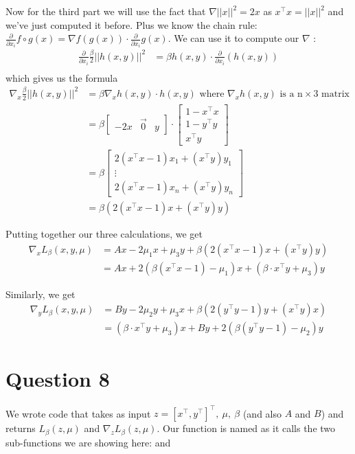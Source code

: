 \documentclass{article}
\newcommand{\tp}{^\top}
\newcommand{\p}{\frac{\partial}{\partial x_i}}
\begin{document}
Now for the third part we will use the fact that $\nabla||x||^2=2x$ as $x\tp x=||x||^2$ and we've just computed it before. Plus we know the chain rule: $\p f\circ g(x)= \nabla f (g(x)) \cdot \p g(x)$. We can use it to compute our $\nabla$ :
\begin{align*}
\p \frac{\beta}{2} ||h(x,y)||^2&=\beta h(x,y) \cdot \p(h(x,y))\\
\end{align*}
which gives us the formula
\begin{align*}
\nabla_x \frac{\beta}{2} ||h(x,y)||^2&=\beta \nabla_x h(x,y) \cdot  h(x,y) \text{ where } \nabla_x h(x,y) \text{ is a n} \times \text{3 matrix}\\
&=\beta\begin{bmatrix} -2x & \vec 0 & y \end{bmatrix}   \cdot \begin{bmatrix} 1-x\tp x \\ 1-y\tp y\\ x\tp y \end{bmatrix} \\
&=\beta\begin{bmatrix}2(x\tp x-1) x_1+(x\tp y )y_1\\ \vdots \\ 2(x\tp x-1) x_n+(x\tp y )y_n \end{bmatrix}\\
&=\beta \left( 2(x\tp x-1)  x+(x\tp y ) y \right) 
\end{align*}

Putting together our three calculations, we get
\begin{align*}
\nabla_x L_\beta(x,y,\mu)&=Ax - 2\mu_1 x+\mu_3 y+\beta \left( 2(x\tp x-1) x+(x\tp y ) y \right) \\
&=Ax+ 2(\beta (x\tp x-1) - \mu_1) x +(\beta \cdot x\tp y + \mu_3)y
\end{align*}

Similarly, we get
\begin{align*}
\nabla_y L_\beta(x,y,\mu)&=By - 2\mu_2 y+\mu_3 x+\beta \left( 2(y\tp y-1)  y+(x\tp y ) x \right) \\
&=(\beta \cdot x\tp y + \mu_3)x+ By + 2(\beta (y\tp y-1) - \mu_2) y
\end{align*}


\section*{Question 8}

We wrote code that takes as input $z = [x\tp, y\tp]\tp,\ \mu,\ \beta$ (and also $A$ and $B$) and returns $L_\beta(z, \mu)$ and $\nabla_z L_\beta(z, \mu)$.
Our function is named  as it calls the two sub-functions we are showing here:  and 
\end{document}

